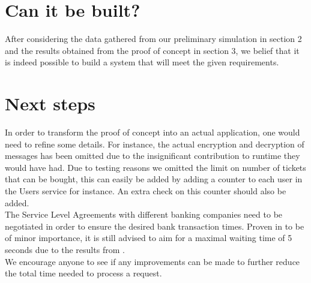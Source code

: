 \documentclass[conference]{IEEEtran}
\begin{document}
\newpage
\section{Can it be built?}
After considering the data gathered from our preliminary simulation in section 2 and the results obtained from the proof of concept in section 3, we belief that it is indeed possible to build a system that will meet the given requirements.

\section{Next steps}
In order to transform the proof of concept into an actual application, one would need to refine some details. For instance, the actual encryption and decryption of messages has been omitted due to the insignificant contribution to runtime they would have had. Due to testing reasons we omitted the limit on number of tickets that can be bought, this can easily be added by adding a counter to each user in the Users service for instance. An extra check on this counter should also be added.\\
The Service Level Agreements with different banking companies need to be negotiated in order to ensure the desired bank transaction times. Proven in  to be of minor importance, it is still advised to aim for a maximal waiting time of 5 seconds due to the results from . \\
We encourage anyone to see if any improvements can be made to further reduce the total time needed to process a request.
\end{document}
